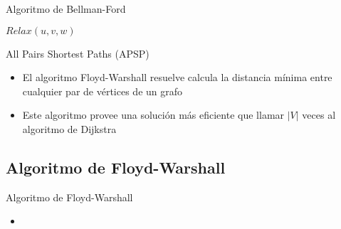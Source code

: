 \documentclass[handout]{beamer}
\begin{document}
\begin{frame}{Algoritmo de Bellman-Ford}
  \begin{algorithm}[H]
    \BlankLine
    {
      {
        $ Relax(u, v, w) $

      }
    }
    {
      {
      }
    }
  \end{algorithm}
\end{frame}

\begin{frame}{All Pairs Shortest Paths (APSP)}
 \begin{itemize}
    \item El algoritmo Floyd-Warshall resuelve calcula la distancia m\'inima entre cualquier par de v\'ertices de un grafo
      \pause
    \item Este algoritmo provee una soluci\'on m\'as eficiente que llamar $|V|$ veces al algoritmo de Dijkstra
  \end{itemize}
\end{frame}

\subsection{Algoritmo de Floyd-Warshall}
\begin{frame}{Algoritmo de Floyd-Warshall}
  \begin{itemize}
    \item 
  \end{itemize}
\end{frame}
\end{document}
